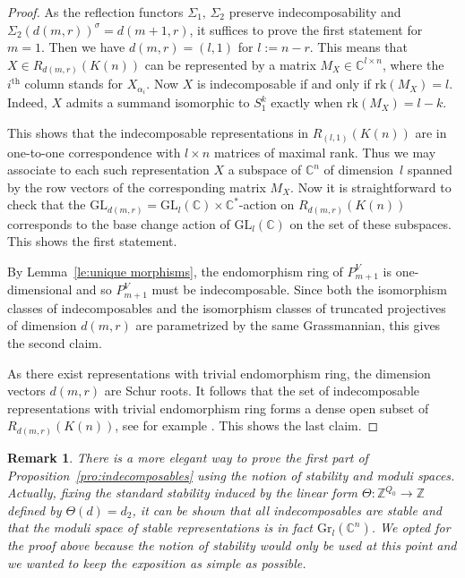 \documentclass{amsart}
\newtheorem{remark}[theorem]{Remark}
\numberwithin{equation}{section}
\newcommand{\CC}{\mathbb{C}}
\newcommand{\ZZ}{\mathbb{Z}}
\newcommand{\Gr}{\mathrm{Gr}}
\newcommand{\GL}{\mathrm{GL}}
\newcommand{\rk}{\mathrm{rk}}
\begin{document}
\begin{proof}
  As the reflection functors $\Sigma_1,\,\Sigma_2$ preserve indecomposability and $\Sigma_2(d(m,r))^\sigma=d(m+1,r)$, it suffices to prove the first statement for $m=1$.
  Then we have $d(m,r)=(l,1)$ for $l:=n-r$.
  This means that $X\in R_{d(m,r)}(K(n))$ can be represented by a matrix $M_X\in\CC^{l\times n}$, where the $i^{\mathrm{th}}$ column stands for $X_{\alpha_i}$.
  Now $X$ is indecomposable if and only if $\rk(M_X)=l$.
  Indeed, $X$ admits a summand isomorphic to $S_1^k$ exactly when $\rk(M_X)=l-k$.

  This shows that the indecomposable representations in $R_{(l,1)}(K(n))$ are in one-to-one correspondence with $l\times n$ matrices of maximal rank.
  Thus we may associate to each such representation $X$ a subspace of $\CC^n$ of dimension~$l$ spanned by the row vectors of the corresponding matrix $M_X$.
  Now it is straightforward to check that the $\GL_{d(m,r)}=\GL_l(\CC)\times\CC^\ast$-action on $R_{d(m,r)}(K(n))$ corresponds to the base change action of $\GL_l(\CC)$ on the set of these subspaces.
  This shows the first statement.

  By Lemma~\ref{le:unique morphisms}, the endomorphism ring of $P_{m+1}^V$ is one-dimensional and so $P_{m+1}^V$ must be indecomposable.
  Since both the isomorphism classes of indecomposables and the isomorphism classes of truncated projectives of dimension $d(m,r)$ are parametrized by the same Grassmannian, this gives the second claim.

  As there exist representations with trivial endomorphism ring, the dimension vectors $d(m,r)$ are Schur roots.
  It follows that the set of indecomposable representations with trivial endomorphism ring forms a dense open subset of $R_{d(m,r)}(K(n))$, see for example \cite[Theorem 2.2]{sch}.
  This shows the last claim.
\end{proof}
\begin{remark}
  There is a more elegant way to prove the first part of Proposition~\ref{pro:indecomposables} using the notion of stability and moduli spaces.
  Actually, fixing the standard stability induced by the linear form $\Theta:\ZZ^{Q_0}\to\ZZ$ defined by $\Theta(d)=d_2$, it can be shown that all indecomposables are stable and that the moduli space of stable representations is in fact $\Gr_l(\CC^n)$.
  We opted for the proof above because the notion of stability would only be used at this point and we wanted to keep the exposition as simple as possible. 
\end{remark}
\end{document}
